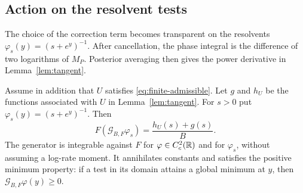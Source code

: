 \subsection{Action on the resolvent tests}

The choice of the correction term becomes transparent on the resolvents $\varphi_s(y)=(s+e^y)^{-1}$.
After cancellation, the phase integral is the difference of two logarithms of $M_P$.
Posterior averaging then gives the power derivative in Lemma~\ref{lem:tangent}.

\begin{lemma}
\label{lem:generator}
Assume in addition that $U$ satisfies \eqref{eq:finite-admissible}.
Let $g$ and $h_U$ be the functions associated with $U$ in Lemma~\ref{lem:tangent}.
For $s>0$ put $\varphi_s(y)=(s+e^y)^{-1}$.
Then
\begin{equation}
 F(\mathcal G_{B,F}\varphi_s)
 =\frac{h_U(s)+g(s)}B.
 \label{eq:generator-tangent}
\end{equation}
The generator is integrable against $F$ for $\varphi\in C_c^2(\mathbb R)$ and for $\varphi_s$, without assuming a log-rate moment.
It annihilates constants and satisfies the positive minimum property: if a test in its domain attains a global minimum at $y$, then $\mathcal G_{B,F}\varphi(y)\ge0$.
\end{lemma}

